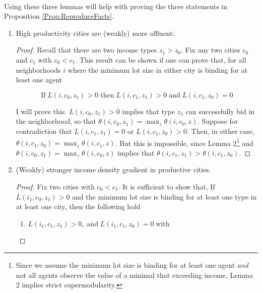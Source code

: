 \documentclass[12pt]{article}
\begin{document}
	\paragraph*{}
	Using these three lemmas will help with proving the three statements in Proposition \ref{Prop:ReproduceFacts}.
	
	\begin{enumerate}
		\item High productivity cities are (weakly) more affluent: \\
		
		\begin{proof}
			Recall that there are two income types $z_{1} > z_{0}$. Fix any two cities $c_{0}$ and $c_{1}$ with $c_{0} < c_{1}$. This result can be shown if one can prove that, for all neighborhoods $i$ where the minimum lot size in either city is binding for at least one agent
			
			\begin{equation*}
			\text{If} \; L(i, c_{0}, z_{1}) > 0 \; \text{then} \; L(i, c_{1}, z_{1}) > 0 \; \text{and} \; L(i, c_{1}, z_{0}) = 0
			\end{equation*}
			
			I will prove this. $L(i, c_{0}, z_{1}) > 0$ implies that type $z_{1}$ can successfully bid in the neighborhood, so that $\theta(i, c_{0}, z_{1}) = \max_{z} \theta(i, c_{0}, z)$. Suppose for contradiction that $L(i, c_{1}, z_{1}) = 0$ or $L(i, c_{1}, z_{0}) > 0$. Then, in either case, $\theta(i, c_{1}, z_{0}) = \max_{z} \theta(i, c_{1}, z)$. But this is impossible, since Lemma 2\footnote{Since we assume the minimum lot size is binding for at least one agent \textit{and} not all agents observe the value of a minimal that exceeding income, Lemma 2 implies strict supermodularity.} and  $\theta(i, c_{0}, z_{1}) = \max_{z} \theta(i, c_{0}, z)$ implies that $\theta(i, c_{1}, z_{1}) > \theta(i, c_{1}, z_{0})$. 
			
		\end{proof}
		
		\item (Weakly) stronger income density gradient in productive cities. 
		
		\begin{proof}
			Fix two cities with $c_{0}  < c_{1}$. It is sufficient to show that, If $L(i_{1}, c_{0}, z_{1}) > 0$ and the minimum lot size is binding for at least one type in at least one city, then the following hold
			
			\begin{enumerate}
				\item $L(i_{1}, c_{1}, z_{1}) > 0, \; \text{and} \;  L(i_{1}, c_{1}, z_{0}) = 0 \; \text{with}$
				

\end{enumerate}
\end{proof}
\end{enumerate}
\end{document}
